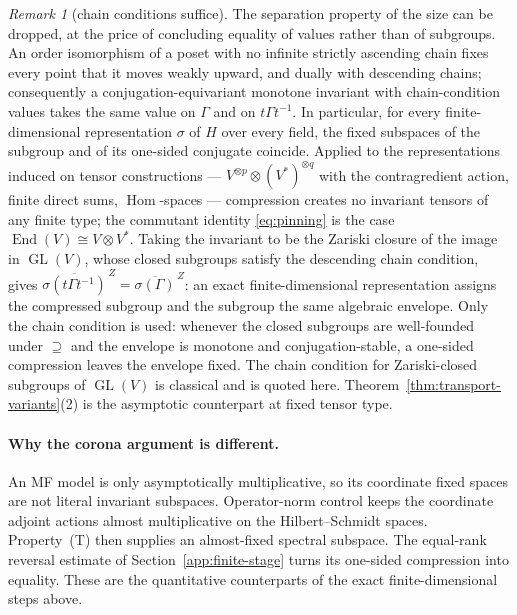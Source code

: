 \documentclass[11pt]{amsart}
\newcommand{\leanverified}[2]{\ignorespaces}
\theoremstyle{definition}
\theoremstyle{remark}
\newtheorem{remark}[theorem]{Remark}
\theoremstyle{plain}
\newcommand{\GL}{\operatorname{GL}}
\newcommand{\End}{\operatorname{End}}
\begin{document}
\begin{remark}[chain conditions suffice]\label{rem:chaincondition}
The separation property of the size can be dropped, at the price of
concluding equality of values rather than of subgroups.  An order isomorphism of a
poset with no infinite strictly ascending chain fixes every point that
it moves weakly upward, and dually with descending chains; consequently
a conjugation-equivariant monotone invariant with chain-condition values
takes the same value on $\Gamma$ and on $t\Gamma t^{-1}$.  In
particular, for every finite-dimensional representation $\sigma$ of $H$
over every field, the fixed subspaces of the subgroup and of its
one-sided conjugate coincide.
\leanverified{Criterion/ChainConditionCompression}{GroupApproximation.manuscriptChainConditionRigidity}
Applied to the representations induced on tensor constructions ---
$V^{\otimes p}\otimes(V^{*})^{\otimes q}$ with the contragredient
action, finite direct sums, $\operatorname{Hom}$-spaces ---
compression creates no invariant tensors of any finite type; the
commutant identity \eqref{eq:pinning} is the case
$\End(V)\cong V\otimes V^{*}$.
\leanverified{Criterion/TensorInvariantRigidity}{GroupApproximation.TensorInvariantRigidity.manuscriptTensorInvariantRigidity}
Taking the invariant to be the
Zariski closure of the image in $\GL(V)$, whose closed subgroups
satisfy the descending chain condition, gives
$\overline{\sigma(t\Gamma t^{-1})}^{\,Z}=\overline{\sigma(\Gamma)}^{\,Z}$:
an exact finite-dimensional representation assigns the compressed
subgroup and the subgroup the same algebraic envelope.  Only the chain
condition is used: whenever the closed subgroups are well-founded
under $\supseteq$ and the envelope is monotone and conjugation-stable,
a one-sided compression leaves the envelope fixed.
\leanverified{Criterion/ClosedEnvelopeCompression}{GroupApproximation.ClosedEnvelopeCompression.manuscriptEnvelopeCompressionBlind}
The chain condition for Zariski-closed subgroups of $\GL(V)$ is
classical and is quoted here.  Theorem~\ref{thm:transport-variants}(2)
is the asymptotic counterpart at fixed tensor type.
\end{remark}

\paragraph{Why the corona argument is different.}
An MF model is only asymptotically multiplicative, so its coordinate fixed
spaces are not literal invariant subspaces.  Operator-norm control keeps
the coordinate adjoint actions almost multiplicative on the
Hilbert--Schmidt spaces.  Property~(T) then supplies an almost-fixed
spectral subspace.  The equal-rank reversal estimate of
Section~\ref{app:finite-stage} turns its one-sided compression into
equality.  These are the quantitative counterparts of the exact
finite-dimensional steps above.
\end{document}

